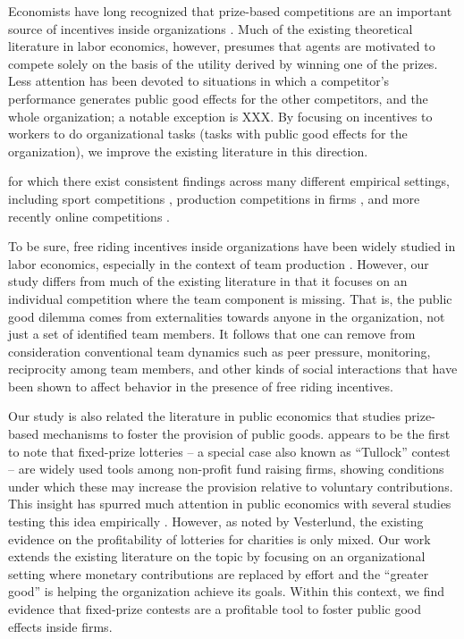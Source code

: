 \documentclass[11pt, titlepage]{article}
\begin{document}
Economists have long recognized that prize-based competitions are an
important source of incentives inside organizations
\citep{lazear1981rank, green1983comparison, nalebuff1983prizes, mary1984economic}.
Much of the existing theoretical literature in labor economics, however,
presumes that agents are motivated to compete solely on the basis of the
utility derived by winning one of the prizes. Less attention has been
devoted to situations in which a competitor's performance generates
public good effects for the other competitors, and the whole
organization; a notable exception is XXX. By focusing on incentives to
workers to do organizational tasks (tasks with public good effects for
the organization), we improve the existing literature in this direction.

for which there exist consistent findings across many different
empirical settings, including sport competitions
\citep{ehrenberg1990tournaments}, production competitions in firms
\citep{knoeber1994testing, terwiesch2008innovation}, and more recently
online competitions
\citep{boudreau2011incentives, boudreau2016performance}.

To be sure, free riding incentives inside organizations have been widely
studied in labor economics, especially in the context of team production
\citep{erev1993constructive, hamilton2003team, boning2007opportunity, gibbs2014field}.
However, our study differs from much of the existing literature in that
it focuses on an individual competition where the team component is
missing. That is, the public good dilemma comes from externalities
towards anyone in the organization, not just a set of identified team
members. It follows that one can remove from consideration conventional
team dynamics such as peer pressure, monitoring, reciprocity among team
members, and other kinds of social interactions that have been shown to
affect behavior in the presence of free riding incentives.

Our study is also related the literature in public economics that
studies prize-based mechanisms to foster the provision of public goods.
\citet{morgan2000funding} appears to be the first to note that
fixed-prize lotteries -- a special case also known as ``Tullock''
contest -- are widely used tools among non-profit fund raising firms,
showing conditions under which these may increase the provision relative
to voluntary contributions. This insight has spurred much attention in
public economics with several studies testing this idea empirically
\citep[see][ for a survey]{vesterlund2012voluntary}. However, as noted
by Vesterlund, the existing evidence on the profitability of lotteries
for charities is only mixed. Our work extends the existing literature on
the topic by focusing on an organizational setting where monetary
contributions are replaced by effort and the ``greater good'' is helping
the organization achieve its goals. Within this context, we find
evidence that fixed-prize contests are a profitable tool to foster
public good effects inside firms.
\end{document}
